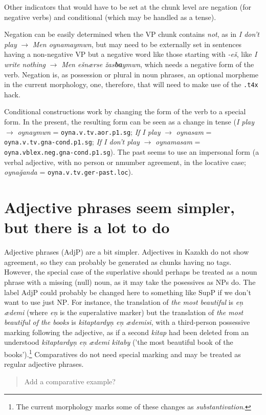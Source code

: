 \documentclass{article}
\newcommand{\com}[1]{\begin{quote}\begin{sf}#1\end{sf}\end{quote}}
\begin{document}
Other indicators that would have to be set at the chunk level are negation (for negative verbs) and conditional (which may be handled as a tense). 

Negation can be easily determined when the VP chunk contains \emph{not}, as in \emph{I don't play} \(\to\) \emph{Men oynamaymwn}, but may need to be externally set in sentences having a non-negative VP but a negative word like those starting with \emph{-eš}, like \emph{I write nothing} \(\to\) \emph{Men ešnærse \v{z}as\textbf{ba}ymwn}, which needs a negative form of the verb. Negation is, as possession or plural in noun phrases, an optional morpheme in the current morphology, one, therefore, that will need to make use of the \texttt{.t4x} hack.

Conditional constructions work by changing the form of the verb to a special form. In the present, the resulting form can be seen as a change in tense (\emph{I play} \(\to\) \emph{oynaymwn} = \texttt{oyna.v.tv.aor.p1.sg}; \emph{If I play} \(\to\) \emph{oynasam} = \texttt{oyna.v.tv.gna-cond.p1.sg}; \emph{If I don't play} \(\to\) \emph{oynamasam} = \texttt{oyna.vblex.neg.gna-cond.p1.sg}). The past seems to use an impersonal form (a verbal adjective, with no person or nmumber agreement, in the locative case; \emph{oyna\u{g}anda} = \texttt{oyna.v.tv.ger-past.loc}).

\section{Adjective phrases seem simpler, but there is a lot to do}

Adjective phrases (\(\mathrm{AdjP}\)) are a bit simpler. Adjectives in
Kazakh do not show agreement, so they can probably be generated as
chunks having no tags. However, the special case of the superlative
should perhaps be treated as a noun phrase with a missing (null) noun,
as it may take the posessives as NPs do. The label \(\mathrm{AdjP}\)
could probably be changed here to something like \(\mathrm{SupP}\) if
we don't want to use just \(\mathrm{NP}\). For instance, the
translation of \emph{the most beautiful} is \emph{e\c{n} ædemi} (where
\emph{e\c{n}} is the superalative marker) but the translation of
\emph{the most beautiful of the books} is \emph{kitaptardy\c{n} e\c{n}
  ædemisi}, with a third-person possessive marking following the
adjective, as if a second \emph{kitap} had been deleted from an
understood \emph{kitaptardy\c{n} e\c{n} ædemi kitaby} ('the most
beautiful book of the books').\footnote{The current morphology marks
  some of these changes as \emph{substantivation}.} Comparatives do
not need special marking and may be treated as regular adjective
phrases.  \com{Add a comparative example?}
\end{document}
